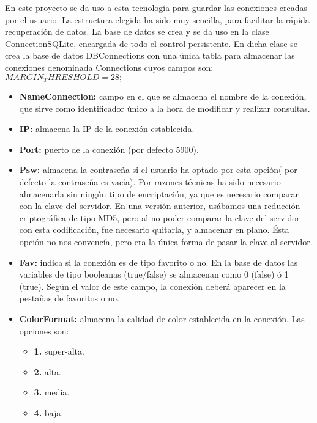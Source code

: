 En este proyecto se da uso a esta tecnología para guardar las conexiones creadas por el usuario. La estructura elegida ha sido muy sencilla, para facilitar la rápida recuperación de datos. La base de datos se crea y se da uso en la clase ConnectionSQLite, encargada de todo el control persistente. En dicha clase se crea la base de datos DBConnections con una única tabla para almacenar las conexiones denominada Connections cuyos campos son: $MARGIN_THRESHOLD = 28;$\\

\begin{itemize}

\item \textbf{NameConnection:} campo en el que se almacena el nombre de la conexión, que sirve como identificador único a la hora de modificar y realizar consultas.
\item \textbf{IP:} almacena la IP de la conexión establecida.
\item \textbf{Port:} puerto de la conexión (por defecto 5900).
\item \textbf{Psw:} almacena la contraseña si el usuario ha optado por esta opción( por defecto la contraseña es vacía). Por razones técnicas ha sido necesario almacenarla sin ningún tipo de encriptación, ya que es necesario comparar con la clave del servidor. En una versión anterior, usábamos una reducción criptográfica de tipo MD5, pero al no poder comparar la clave del servidor con esta codificación, fue necesario quitarla, y almacenar en plano. Ésta opción no nos convencía, pero era la única forma de pasar la clave al servidor.
\item \textbf{Fav:} indica si la conexión es de tipo favorito o no. En la base de datos las variables de tipo booleanas (true/false) se almacenan como 0 (false) ó 1 (true). Según el valor de este campo, la conexión deberá aparecer en la pestañas de favoritos o no.
\item \textbf{ColorFormat:} almacena la calidad de color establecida en la conexión. Las opciones son:

\begin{itemize}
\item \textbf{1.} super-alta.
\item \textbf{2.} alta.
\item \textbf{3.} media.
\item \textbf{4.} baja.

\end{itemize}

\end{itemize}

